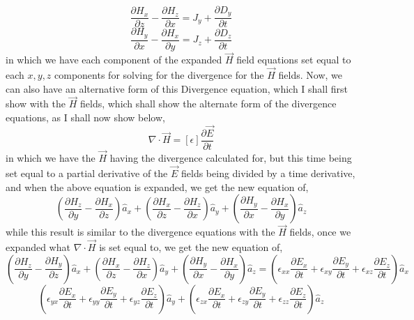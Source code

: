 \documentclass[]{article}
\begin{document}
\begin{equation}
\frac{\partial{H}_x}{\partial{z}} - \frac{\partial{H}_z}{\partial{x}} = J_y + \frac{\partial{D}_y}{\partial{t}} 
\end{equation}
\begin{equation}
\frac{\partial{H}_y}{\partial{x}} - \frac{\partial{H}_x}{\partial{y}} = J_z + \frac{\partial{D}_z}{\partial{t}}
\end{equation}
in which we have each component of the expanded $\vec{H}$ field equations set equal to each $x,y,z$ components for solving for the divergence for the $\vec{H}$ fields. Now, we can also have an alternative form of this Divergence equation, which I shall first show with the $\vec{H}$ fields, which shall show the alternate form of the divergence equations, as I shall now show below,
\begin{equation}
\nabla \cdot \vec{H} = [\epsilon] \frac{\partial{\vec{E}}}{\partial{t}}
\end{equation}
in which we have the $\vec{H}$ having the divergence calculated for, but this time being set equal to a partial derivative of the $\vec{E}$ fields being divided by a time derivative, and when the above equation is expanded, we get the new equation of,
\begin{equation}
(\frac{\partial{H}_z}{\partial{y}} - \frac{\partial{H}_x}{\partial{z}})\hat{a}_x + (\frac{\partial{H}_x}{\partial{z}} - \frac{\partial{H}_z}{\partial{x}})\hat{a}_y + (\frac{\partial{H}_y}{\partial{x}} - \frac{\partial{H}_x}{\partial{y}})\hat{a}_z
\end{equation}
while this result is similar to the divergence equations with the $\vec{H}$ fields, once we expanded what $\nabla \cdot \vec{H}$ is set equal to, we get the new equation of,
\begin{equation}
(\frac{\partial{H}_z}{\partial{y}} - \frac{\partial{H}_y}{\partial{z}})\hat{a}_x + (\frac{\partial{H}_x}{\partial{z}} - \frac{\partial{H}_z}{\partial{x}})\hat{a}_y + (\frac{\partial{H}_y}{\partial{x}} - \frac{\partial{H}_x}{\partial{y}})\hat{a}_z = (\epsilon_{xx}\frac{\partial{E}_x}{\partial{t}} + \epsilon_{xy}\frac{\partial{E}_y}{\partial{t}} + \epsilon_{xz}\frac{\partial{E}_z}{\partial{t}})\hat{a}_x 
\end{equation}
\begin{equation}
(\epsilon_{yx}\frac{\partial{E}_x}{\partial{t}} + \epsilon_{yy}\frac{\partial{E}_y}{\partial{t}} + \epsilon_{yz}\frac{\partial{E}_z}{\partial{t}})\hat{a}_y + (\epsilon_{zx}\frac{\partial{E}_x}{\partial{t}} + \epsilon_{zy}\frac{\partial{E}_y}{\partial{t}} + \epsilon_{zz}\frac{\partial{E}_z}{\partial{t}})\hat{a}_z
\end{equation}
\end{document}
